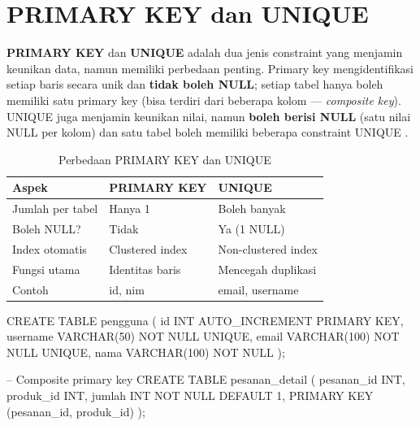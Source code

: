 ﻿\section{PRIMARY KEY dan UNIQUE}

\textbf{PRIMARY KEY} dan \textbf{UNIQUE} adalah dua jenis constraint yang menjamin keunikan data, namun memiliki perbedaan penting. Primary key mengidentifikasi setiap baris secara unik dan \textbf{tidak boleh NULL}; setiap tabel hanya boleh memiliki satu primary key (bisa terdiri dari beberapa kolom --- \textit{composite key}). UNIQUE juga menjamin keunikan nilai, namun \textbf{boleh berisi NULL} (satu nilai NULL per kolom) dan satu tabel boleh memiliki beberapa constraint UNIQUE \cite{mysqlDocs}.

\begin{table}[H]
\centering
\begin{tabular}{|P{3.5cm}|P{5cm}|P{5cm}|}
\hline
\textbf{Aspek} & \textbf{PRIMARY KEY} & \textbf{UNIQUE} \\
\hline
Jumlah per tabel & Hanya 1 & Boleh banyak \\
\hline
Boleh NULL? & Tidak & Ya (1 NULL) \\
\hline
Index otomatis & Clustered index & Non-clustered index \\
\hline
Fungsi utama & Identitas baris & Mencegah duplikasi \\
\hline
Contoh & id, nim & email, username \\
\hline
\end{tabular}
\caption{Perbedaan PRIMARY KEY dan UNIQUE}
\end{table}

\begin{webcode}[language=SQL, caption={Penggunaan PRIMARY KEY dan UNIQUE}]
CREATE TABLE pengguna (
  id       INT AUTO_INCREMENT PRIMARY KEY,
  username VARCHAR(50) NOT NULL UNIQUE,
  email    VARCHAR(100) NOT NULL UNIQUE,
  nama     VARCHAR(100) NOT NULL
);

-- Composite primary key
CREATE TABLE pesanan_detail (
  pesanan_id INT,
  produk_id  INT,
  jumlah     INT NOT NULL DEFAULT 1,
  PRIMARY KEY (pesanan_id, produk_id)
);
\end{webcode}


